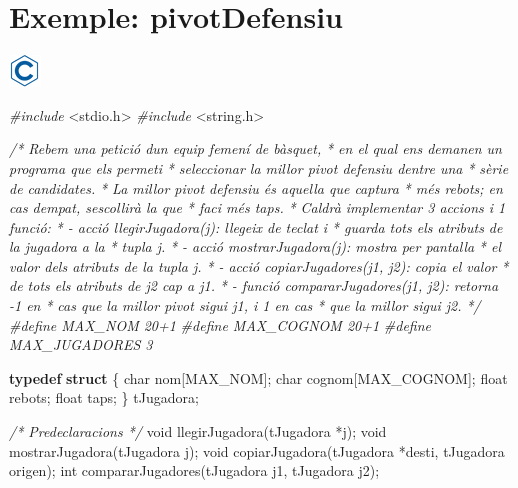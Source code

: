 \documentclass[]{book}
\newenvironment{Shaded}{\begin{snugshade}}{\end{snugshade}}
\newcommand{\CommentTok}[1]{\textcolor[rgb]{0.56,0.35,0.01}{\textit{#1}}}
\newcommand{\DataTypeTok}[1]{\textcolor[rgb]{0.13,0.29,0.53}{#1}}
\newcommand{\ImportTok}[1]{#1}
\newcommand{\KeywordTok}[1]{\textcolor[rgb]{0.13,0.29,0.53}{\textbf{#1}}}
\newcommand{\NormalTok}[1]{#1}
\newcommand{\PreprocessorTok}[1]{\textcolor[rgb]{0.56,0.35,0.01}{\textit{#1}}}
\begin{document}
\hypertarget{exemple-pivotdefensiu}{%
\section{Exemple: pivotDefensiu}\label{exemple-pivotdefensiu}}

\includegraphics{./img/c.png}

\begin{Shaded}
\begin{Highlighting}[]
\PreprocessorTok{\#include }\ImportTok{\textless{}stdio.h\textgreater{}}
\PreprocessorTok{\#include }\ImportTok{\textless{}string.h\textgreater{}}

\CommentTok{/* Rebem una petició d\textquotesingle{}un equip femení de bàsquet,}
\CommentTok{ * en el qual ens demanen un programa que els permeti}
\CommentTok{ * seleccionar la millor pivot defensiu d\textquotesingle{}entre una }
\CommentTok{ * sèrie de candidates.}
\CommentTok{ * La millor pivot defensiu és aquella que captura}
\CommentTok{ * més rebots; en cas d\textquotesingle{}empat, s\textquotesingle{}escollirà la que}
\CommentTok{ * faci més taps.}
\CommentTok{ * Caldrà implementar 3 accions i 1 funció:}
\CommentTok{ * {-} acció llegirJugadora(j): llegeix de teclat i}
\CommentTok{ * guarda tots els atributs de la jugadora a la}
\CommentTok{ * tupla j.}
\CommentTok{ * {-} acció mostrarJugadora(j): mostra per pantalla}
\CommentTok{ * el valor dels atributs de la tupla j.}
\CommentTok{ * {-} acció copiarJugadores(j1, j2): copia el valor}
\CommentTok{ * de tots els atributs de j2 cap a j1.}
\CommentTok{ * {-} funció compararJugadores(j1, j2): retorna {-}1 en }
\CommentTok{ * cas que la millor pivot sigui j1, i 1 en cas }
\CommentTok{ * que la millor sigui j2.}
\CommentTok{ */}
\PreprocessorTok{\#define MAX\_NOM 20+1}
\PreprocessorTok{\#define MAX\_COGNOM 20+1}
\PreprocessorTok{\#define MAX\_JUGADORES 3}

\KeywordTok{typedef} \KeywordTok{struct}\NormalTok{ \{}
    \DataTypeTok{char}\NormalTok{ nom[MAX\_NOM];}
    \DataTypeTok{char}\NormalTok{ cognom[MAX\_COGNOM];}
    \DataTypeTok{float}\NormalTok{ rebots;}
    \DataTypeTok{float}\NormalTok{ taps;}
\NormalTok{\} tJugadora;}

\CommentTok{/* Predeclaracions */}
\DataTypeTok{void}\NormalTok{ llegirJugadora(tJugadora *j);}
\DataTypeTok{void}\NormalTok{ mostrarJugadora(tJugadora j);}
\DataTypeTok{void}\NormalTok{ copiarJugadora(tJugadora *desti, tJugadora origen);}
\DataTypeTok{int}\NormalTok{ compararJugadores(tJugadora j1, tJugadora j2);}


\end{Highlighting}
\end{Shaded}
\end{document}
